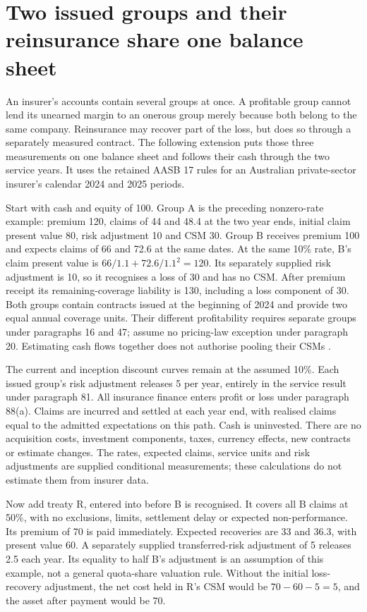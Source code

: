 \section{Two issued groups and their reinsurance share one balance sheet}
\label{sec:insurance-connected-groups}

An insurer's accounts contain several groups at once. A profitable group
cannot lend its unearned margin to an onerous group merely because both
belong to the same company. Reinsurance may recover part of the loss, but
does so through a separately measured contract. The following extension
puts those three measurements on one balance sheet and follows their cash
through the two service years. It uses the retained AASB 17 rules for an
Australian private-sector insurer's calendar 2024 and 2025 periods.

Start with cash and equity of 100. Group A is the preceding nonzero-rate
example: premium 120, claims of 44 and 48.4 at the two year ends, initial
claim present value 80, risk adjustment 10 and CSM 30. Group B receives
premium 100 and expects claims of 66 and 72.6 at the same dates. At the
same 10\% rate, B's claim present value is
\(66/1.1+72.6/1.1^2=120\). Its separately supplied risk adjustment is 10,
so it recognises a loss of 30 and has no CSM. After premium receipt its
remaining-coverage liability is 130, including a loss component of 30.
Both groups contain contracts issued at the beginning of 2024 and provide
two equal annual coverage units. Their different profitability requires
separate groups under paragraphs 16 and 47; assume no pricing-law exception
under paragraph 20. Estimating cash flows together does not authorise pooling
their CSMs \citep[paragraphs 14--28, 32--38 and 47]{aasb17}.

The current and inception discount curves remain at the assumed 10\%.
Each issued group's risk adjustment releases 5 per year, entirely in the
service result under paragraph 81. All insurance finance enters profit or
loss under paragraph 88(a). Claims are incurred and settled at each year
end, with realised claims equal to the admitted expectations on this path.
Cash is uninvested. There are no acquisition costs, investment components,
taxes, currency effects, new contracts or estimate changes. The rates,
expected claims, service units and risk adjustments are supplied conditional
measurements; these calculations do not estimate them from insurer data.

Now add treaty R, entered into before B is recognised. It covers all B
claims at 50\%, with no exclusions, limits, settlement delay or expected
non-performance. Its premium of 70 is paid immediately. Expected recoveries
are 33 and 36.3, with present value 60. A separately supplied transferred-risk
adjustment of 5 releases 2.5 each year. Its equality to half B's adjustment
is an assumption of this example, not a general quota-share valuation rule.
Without the initial loss-recovery adjustment, the net cost held in R's CSM
would be \(70-60-5=5\), and the asset after payment would be 70.

